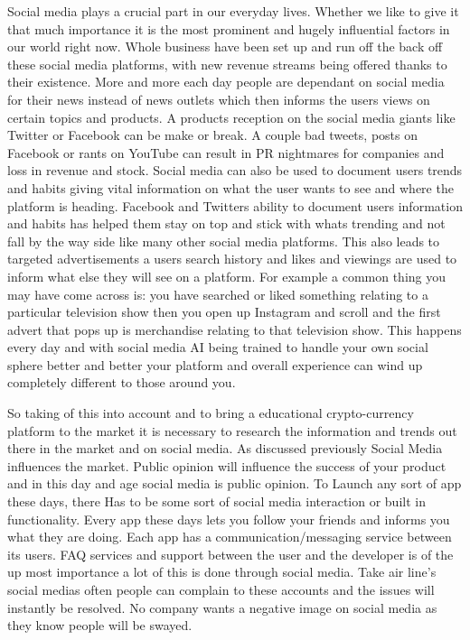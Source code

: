 Social media plays a crucial part in our everyday lives. Whether we like to give it that much importance it is the most prominent and hugely influential factors in our world right now. Whole business have been set up and run off the back off these social media platforms, with new revenue streams being offered thanks to their existence. More and more each day people are dependant on social media for their news instead of news outlets which then informs the users views on certain topics and products. A products reception on the social media giants like Twitter or Facebook can be make or break. A couple bad tweets, posts on Facebook or rants on YouTube can result in PR nightmares for companies and loss in revenue and stock. Social media can also be used to document users trends and habits giving vital information on what the user wants to see and where the platform is heading. 
Facebook and Twitters ability to document users information and habits has helped them stay on top and stick with whats trending and not fall by the way side like many other social media platforms. This also leads to targeted advertisements a users search history and likes and viewings are used to inform what else they will see on a platform. For example a common thing you may have come across is: you have searched or liked something relating to a particular television show then you open up Instagram and scroll and the first advert that pops up is merchandise relating to that television show. This happens every day and with social media AI being trained to handle your own social sphere better and better your platform and overall experience can wind up completely different to those around you. 

So taking of this into account and to bring a educational crypto-currency platform to the market it is necessary to research the information and trends out there in the market and on social media. As discussed previously Social Media influences the market. Public opinion will influence the success of your product and in this day and age social media is public opinion. To Launch any sort of app these days, there Has to be some sort of social media interaction or built in functionality. Every app these days lets you follow your friends and informs you what they are doing. Each app has a communication/messaging service between its users. FAQ services and support between the user and the developer is of the up most importance a lot of this is done through social media. Take air line's social medias often people can complain to these accounts and the issues will instantly be resolved. No company wants a negative image on social media as they know people will be swayed. 

